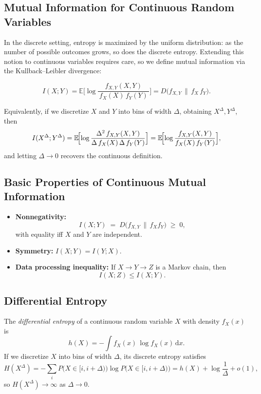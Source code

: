 \subsection{Mutual Information for Continuous Random Variables}

In the discrete setting, entropy is maximized by the uniform distribution: as the number of possible outcomes grows, so does the discrete entropy.  Extending this notion to continuous variables requires care, so we define mutual information via the Kullback–Leibler divergence:

\[
I(X;Y)
=\mathbb{E}\!\biggl[\log\frac{f_{X,Y}(X,Y)}{\,f_X(X)\,f_Y(Y)\,}\biggr]
= D\bigl(f_{X,Y}\,\|\,f_X\,f_Y\bigr).
\]

Equivalently, if we discretize $X$ and $Y$ into bins of width $\Delta$, obtaining $X^\Delta,Y^\Delta$, then
\[
I(X^\Delta;Y^\Delta)
=\mathbb{E}\!\Bigl[\log\frac{\Delta^2\,f_{X,Y}(X,Y)}{\Delta\,f_X(X)\,\Delta\,f_Y(Y)}\Bigr]
=\mathbb{E}\!\Bigl[\log\frac{f_{X,Y}(X,Y)}{f_X(X)\,f_Y(Y)}\Bigr],
\]
and letting $\Delta\to0$ recovers the continuous definition.

\subsection{Basic Properties of Continuous Mutual Information}

\begin{itemize}
  
  \item \textbf{Nonnegativity:}  
    \[    I(X;Y)\;=\;D\bigl(f_{X,Y}\,\|\,f_Xf_Y\bigr)\;\ge\;0,
    \]
    with equality iff $X$ and $Y$ are independent.
  \item \textbf{Symmetry:}  $I(X;Y)=I(Y;X)$.
  \item \textbf{Data processing inequality:}  
    If $X\to Y\to Z$ is a Markov chain, then
    \[
      I(X;Z)\le I(X;Y).
    \]
\end{itemize}




\subsection{Differential Entropy}

The \emph{differential entropy} of a continuous random variable $X$ with density $f_X(x)$ is
\[
h(X) = -\int f_X(x)\,\log f_X(x)\,\mathrm{d}x.
\]
If we discretize $X$ into bins of width $\Delta$, its discrete entropy satisfies
\[
H(X^\Delta)
=-\sum_i P\bigl(X\in[i,i+\Delta)\bigr)\log P\bigl(X\in[i,i+\Delta)\bigr)
= h(X) + \log\frac1\Delta + o(1),
\]
so $H(X^\Delta)\to\infty$ as $\Delta\to0$.

